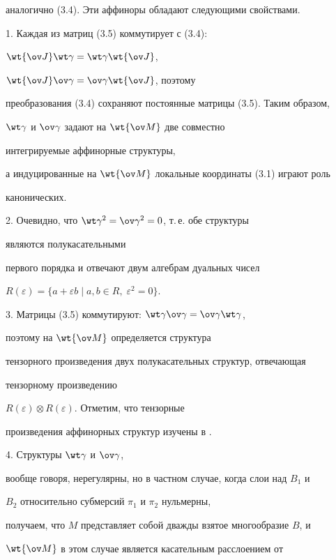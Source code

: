 аналогично (3.4). Эти аффиноры обладают следующими свойствами.





1. Каждая из матриц (3.5) коммутирует с (3.4):


$\wt{\ov J}\wt\gamma=\wt\gamma\wt{\ov J}$,


$\wt{\ov J}\ov\gamma=\ov\gamma\wt{\ov J}$, поэтому


преобразования (3.4) сохраняют постоянные матрицы (3.5). Таким образом,


$\wt\gamma$ и $\ov\gamma$ задают на $\wt{\ov M}$ две совместно


интегрируемые аффинорные структуры,


а индуцированные на $\wt{\ov M}$ локальные координаты (3.1) играют роль


канонических.





2. Очевидно, что $\wt\gamma^2=\ov\gamma^2=0$, т.\,е. обе структуры


являются полукасательными


первого порядка и отвечают двум алгебрам дуальных чисел


$R(\varepsilon)=\{a+\varepsilon b\mid a,b\in R,\;\varepsilon^2=0\}$.





3. Матрицы (3.5) коммутируют: $\wt\gamma\ov\gamma=\ov\gamma\wt\gamma$,


поэтому на $\wt{\ov M}$ определяется структура


тензорного произведения двух полукасательных структур, отвечающая


тензорному произведению


$R(\varepsilon)\otimes R(\varepsilon)$. Отметим, что тензорные


произведения аффинорных структур изучены в \cite{4}.





4. Структуры $\wt\gamma$ и $\ov\gamma$,


вообще говоря, нерегулярны, но в частном случае, когда слои над $B_1$ и


$B_2$ относительно субмерсий $\pi_1$ и $\pi_2$ нульмерны,


получаем, что $M$ представляет собой дважды взятое многообразие $B$, и


$\wt{\ov M}$ в этом случае является касательным расслоением от


